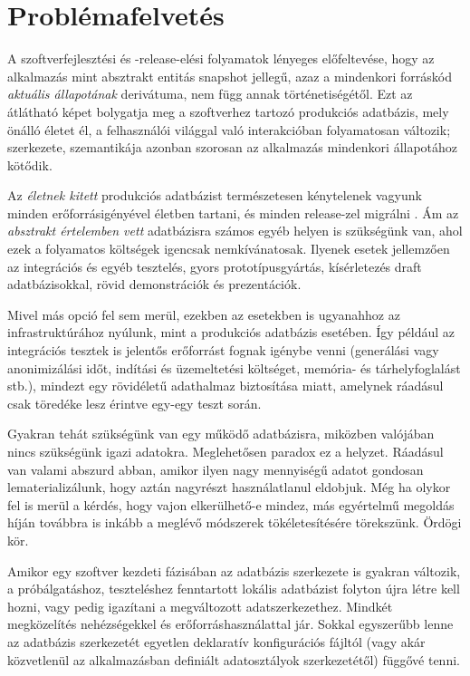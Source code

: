 \documentclass[
    parspace,
    noindent,
    nohyp,
]{elteiktdk}[2023/04/10]
\newcommand{\todoref}[1]{\todo[inline, noinlinepar, color=red, textcolor=white, inlinewidth=0.6cm, caption={#1}]{\large \textbf{×}}}
\begin{document}
\section{Problémafelvetés}

A szoftverfejlesztési és -release-elési folyamatok lényeges előfeltevése,
hogy az alkalmazás mint absztrakt entitás snapshot jellegű,
azaz a mindenkori forráskód \textit{aktuális állapotának} derivátuma,
nem függ annak történetiségétől.
Ezt az átlátható képet bolygatja meg a szoftverhez tartozó produkciós adatbázis,
mely önálló életet él, a felhasználói világgal való interakcióban folyamatosan változik;
szerkezete, szemantikája azonban szorosan az alkalmazás mindenkori állapotához kötődik.%
\cite{Ploski2007DatabaseCentricVersioning,Fluri2023DatabaseCiCd,Edwards2023LiveLocalSchemaChange}

Az \textit{életnek kitett} produkciós adatbázist természetesen kénytelenek vagyunk
minden erőforrásigényével életben tartani, és minden release-zel migrálni \todoref{+CITE: DB-migráció (flyway/liquibase...?)}.
Ám az \textit{absztrakt értelemben vett} adatbázisra számos egyéb helyen is szükségünk van,
ahol ezek a folyamatos költségek igencsak nemkívánatosak.
Ilyenek esetek jellemzően az integrációs és egyéb tesztelés, gyors prototípusgyártás, kísérletezés draft adatbázisokkal, rövid demonstrációk és prezentációk.

Mivel más opció fel sem merül, ezekben az esetekben is ugyanahhoz az infrastruktúrához nyúlunk,
mint a produkciós adatbázis esetében.
Így például az integrációs tesztek is jelentős erőforrást fognak igénybe venni
(generálási vagy anonimizálási időt, indítási  és üzemeltetési költséget, memória- és tárhelyfoglalást stb.),
mindezt egy rövidéletű adathalmaz biztosítása miatt,
amelynek ráadásul csak töredéke lesz érintve egy-egy teszt során.

Gyakran tehát szükségünk van egy működő adatbázisra,
miközben valójában nincs szükségünk igazi adatokra.
Meglehetősen paradox ez a helyzet.
Ráadásul van valami abszurd abban, amikor ilyen nagy mennyiségű adatot
gondosan lematerializálunk, hogy aztán nagyrészt használatlanul eldobjuk.
Még ha olykor fel is merül a kérdés, hogy vajon elkerülhető-e mindez,
más egyértelmű megoldás híján továbbra is inkább a meglévő módszerek tökéletesítésére törekszünk.
Ördögi kör.

Amikor egy szoftver kezdeti fázisában az adatbázis szerkezete is gyakran változik,
a próbálgatáshoz, teszteléshez fenntartott lokális adatbázist folyton újra létre kell hozni,
vagy pedig igazítani a megváltozott adatszerkezethez.
Mindkét megközelítés nehézségekkel és erőforráshasználattal jár.
Sokkal egyszerűbb lenne az adatbázis szerkezetét egyetlen deklaratív konfigurációs fájltól
(vagy akár közvetlenül az alkalmazásban definiált adatosztályok szerkezetétől) függővé tenni.
\end{document}
